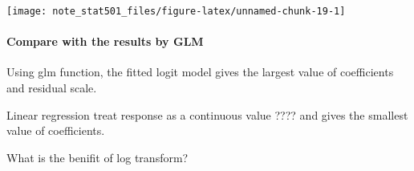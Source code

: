 \documentclass[
]{article}
\begin{document}
\begin{center}\texttt{[image: note\_stat501\_files/figure-latex/unnamed-chunk-19-1]} \end{center}

\hypertarget{compare-with-the-results-by-glm}{%
\paragraph{Compare with the results by
GLM}\label{compare-with-the-results-by-glm}}

Using glm function, the fitted logit model gives the largest value of
coefficients and residual scale.

Linear regression treat response as a continuous value {????} and gives
the smallest value of coefficients.

What is the benifit of log transform?
\end{document}
